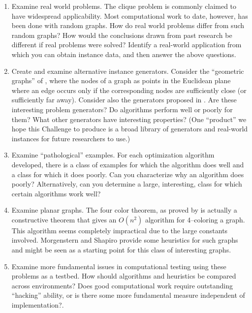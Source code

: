 \begin{enumerate}
\item Examine real world problems.  The clique problem is commonly
claimed to have widespread applicability.  Most computational
work to date, however, has been done with random graphs.  How do real world
problems differ from such random graphs?  How would the conclusions drawn from
past research be different if real problems were solved?  Identify a real-world
application from which you can obtain instance data, and then answer the above
questions.

\item Create and examine alternative instance generators.  Consider the
``geometric graphs'' of \cite{JAMS91}, where the nodes
of a graph as points in the Euclidean plane where an edge occurs only
if the corresponding nodes are sufficiently close (or sufficiently far
away).  Consider also the generators proposed in \cite{HPV92}.
Are these interesting problem generators?  Do algorithms
perform well or poorly for them?  What other generators have interesting
properties?  (One ``product'' we hope this Challenge to produce is a
broad library of generators and real-world instances for future researchers
to use.)

\item Examine ``pathological'' examples.  For each optimization
algorithm developed, there is a class of examples for which the
algorithm does well and a class for which it does poorly.  Can you
characterize why an algorithm does poorly?  Alternatively, can you
determine a large, interesting, class for which certain algorithms
work well?

\item Examine planar graphs.  The four color theorem, as proved by
\cite{ApHa77a,ApHa77b} is actually a constructive theorem that gives an $O(n^2)$
algorithm for 4--coloring a graph.  This algorithm seems completely
impractical due to the large constants involved.  Morgenstern and
Shapiro \cite{MoSh91} provide some heuristics for such graphs and might
be seen as a starting point for this class of interesting graphs.

\item Examine more fundamental issues in computational testing using these
problems as a testbed.  How should algorithms and heuristics be
compared across environments?  Does good computational work require
outstanding ``hacking'' ability, or is there some more fundamental
measure independent of implementation?.

\end{enumerate}

